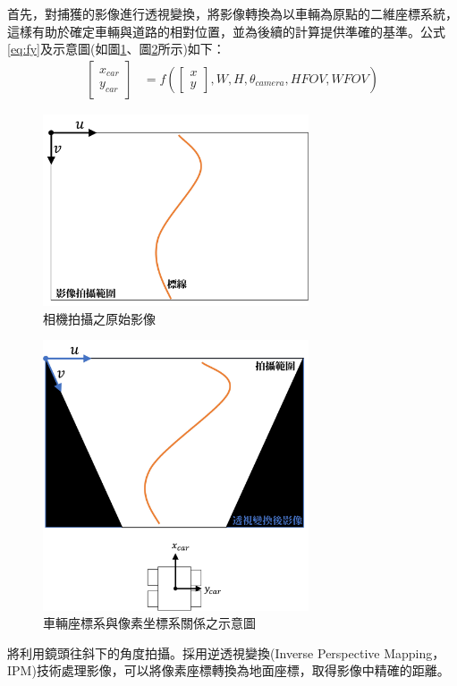 \documentclass[12pt]{article}       %
\begin{document}
首先，對捕獲的影像進行透視變換，將影像轉換為以車輛為原點的二維座標系統，這樣有助於確定車輛與道路的相對位置，並為後續的計算提供準確的基準。公式\ref{eq:fy}及示意圖(如圖\ref{fig:15}、圖\ref{fig:14}所示)如下：
\begin{align}
    \begin{bmatrix}
        x_{car}   \\
        y_{car}   
    \end{bmatrix} 
     &=f(
     \begin{bmatrix}
        x       \\
        y       
    \end{bmatrix} 
    ,W,H,\theta_{camera},HFOV,WFOV)
    \label{eq:xcarycar}
\end{align}
\begin{figure}[H]
    \centering
    \includegraphics[width=0.7\textwidth]{15.jpg}     %
    \caption{相機拍攝之原始影像}    %
    \label{fig:15}    %
\end{figure}
\begin{figure}[H]
    \centering
    \includegraphics[width=0.7\textwidth]{14.jpg}     %
    \caption{車輛座標系與像素坐標系關係之示意圖}    %
    \label{fig:14}    %
\end{figure}
將利用鏡頭往斜下的角度拍攝。採用逆透視變換(Inverse Perspective Mapping，IPM)\cite{lin_2001}\cite{bertozz1998stereo}\cite{mallot1991inverse}技術處理影像，可以將像素座標轉換為地面座標，取得影像中精確的距離。
\end{document}
